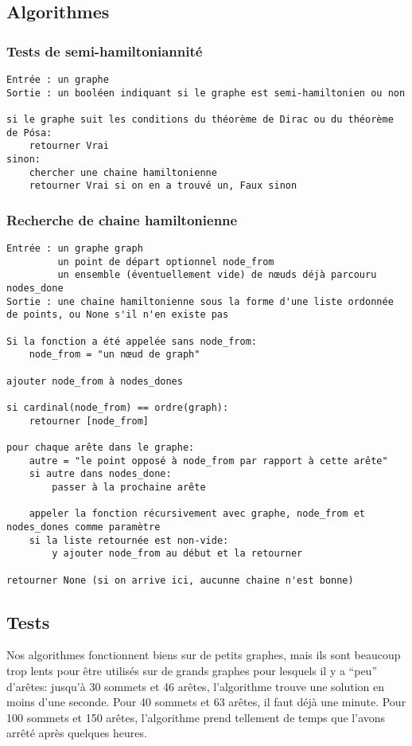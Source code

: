 \documentclass{scrartcl}
\begin{document}
  \subsection{Algorithmes}
    \subsubsection{Tests de semi-hamiltoniannité}
      \begin{lstlisting}
Entrée : un graphe
Sortie : un booléen indiquant si le graphe est semi-hamiltonien ou non

si le graphe suit les conditions du théorème de Dirac ou du théorème de Pósa:
    retourner Vrai
sinon:
    chercher une chaine hamiltonienne
    retourner Vrai si on en a trouvé un, Faux sinon
      \end{lstlisting}

    \subsubsection{Recherche de chaine hamiltonienne}
      \begin{lstlisting}
Entrée : un graphe graph
         un point de départ optionnel node_from
         un ensemble (éventuellement vide) de nœuds déjà parcouru nodes_done
Sortie : une chaine hamiltonienne sous la forme d'une liste ordonnée de points, ou None s'il n'en existe pas

Si la fonction a été appelée sans node_from:
    node_from = "un nœud de graph"

ajouter node_from à nodes_dones

si cardinal(node_from) == ordre(graph):
    retourner [node_from]

pour chaque arête dans le graphe:
    autre = "le point opposé à node_from par rapport à cette arête"
    si autre dans nodes_done:
        passer à la prochaine arête

    appeler la fonction récursivement avec graphe, node_from et nodes_dones comme paramètre
    si la liste retournée est non-vide:
        y ajouter node_from au début et la retourner

retourner None (si on arrive ici, aucunne chaine n'est bonne)
      \end{lstlisting}

  \subsection{Tests}
    Nos algorithmes fonctionnent biens sur de petits graphes, mais ils sont
    beaucoup trop lents pour être utilisés sur de grands graphes pour lesquels
    il y a ``peu'' d'arêtes: jusqu'à 30 sommets et 46 arêtes, l'algorithme
    trouve une solution en moins d'une seconde. Pour 40 sommets et 63 arêtes,
    il faut déjà une minute. Pour 100 sommets et 150 arêtes, l'algorithme
    prend tellement de temps que l'avons arrêté après quelques heures.
\end{document}
